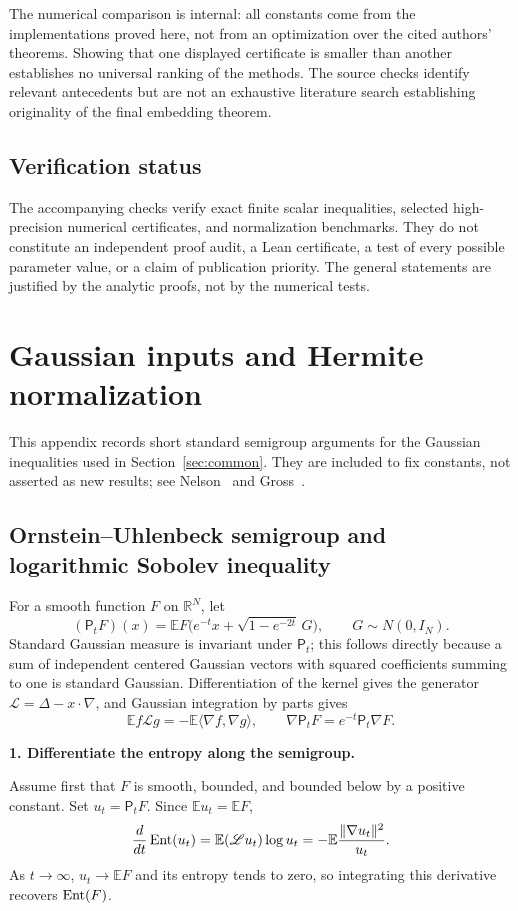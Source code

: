 \documentclass[11pt]{article}
\numberwithin{equation}{section}
\theoremstyle{definition}\newtheorem{definition}[theorem]{Definition}
\theoremstyle{remark}\newtheorem{remark}[theorem]{Remark}
\newcommand{\R}{\mathbb R}\newcommand{\E}{\mathbb E}\newcommand{\Prob}{\mathbb P}
\newcommand{\norm}[1]{\lVert#1\rVert}\newcommand{\ip}[2]{\langle#1,#2\rangle}
\newcommand{\step}[1]{\par\addvspace{.65\baselineskip}\Needspace{4\baselineskip}\noindent\textbf{#1}\par\nobreak\smallskip}
\begin{document}
The numerical comparison is internal: all constants come from the implementations
proved here, not from an optimization over the cited authors' theorems. Showing
that one displayed certificate is smaller than another establishes no universal
ranking of the methods. The source checks identify relevant antecedents but are
not an exhaustive literature search establishing originality of the final
embedding theorem.

\subsection{Verification status}

The accompanying checks verify exact finite scalar inequalities, selected
high-precision numerical certificates, and normalization benchmarks. They do not
constitute an independent proof audit, a Lean certificate, a test of every
possible parameter value, or a claim of publication priority. The general
statements are justified by the analytic proofs, not by the numerical tests.

\clearpage
\appendix
\section{Gaussian inputs and Hermite normalization}\label{app:gaussian}
This appendix records short standard semigroup arguments for the Gaussian
inequalities used in Section~\ref{sec:common}. They are included to fix constants,
not asserted as new results; see Nelson~\cite{Nelson} and
Gross~\cite{Gross,GrossSurvey}.

\subsection{Ornstein--Uhlenbeck semigroup and logarithmic Sobolev inequality}
For a smooth function $F$ on $\R^N$, let
\[
 (\mathsf P_tF)(x)=\E F\bigl(e^{-t}x+\sqrt{1-e^{-2t}}\,G\bigr),
 \qquad G\sim N(0,I_N).
\]
Standard Gaussian measure is invariant under $\mathsf P_t$; this follows directly
because a sum of independent centered Gaussian vectors with squared coefficients
summing to one is standard Gaussian. Differentiation of the kernel gives the
generator $\mathscr L=\Delta-x\cdot\nabla$, and Gaussian integration by parts gives
\[
 \E f\mathscr Lg=-\E\ip{\nabla f}{\nabla g},\qquad
 \nabla\mathsf P_tF=e^{-t}\mathsf P_t\nabla F.
\]

\step{1. Differentiate the entropy along the semigroup.}
Assume first that $F$ is smooth, bounded, and bounded below by a positive constant.
Set $u_t=\mathsf P_tF$. Since $\E u_t=\E F$,
\[
 \frac{d}{dt}\Ent(u_t)
 =\E(\mathscr Lu_t)\log u_t
 =-\E\frac{\norm{\nabla u_t}^2}{u_t}.
\]
As $t\to\infty$, $u_t\to\E F$ and its entropy tends to zero, so integrating this
derivative recovers $\operatorname{Ent}(F)$.
\end{document}
